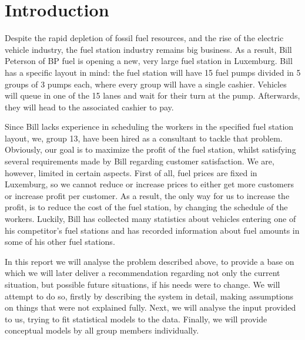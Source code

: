 \section{Introduction}
Despite the rapid depletion of fossil fuel resources, and the rise of the electric vehicle industry, the fuel station industry remains big business.
As a result, Bill Peterson of BP fuel is opening a new, very large fuel station in Luxemburg.
Bill has a specific layout in mind: the fuel station will have 15 fuel pumps divided in 5 groups of 3 pumps each, where every group will have a single cashier.
Vehicles will queue in one of the 15 lanes and wait for their turn at the pump.
Afterwards, they will head to the associated cashier to pay.

Since Bill lacks experience in scheduling the workers in the specified fuel station layout, we, group 13, have been hired as a consultant to tackle that problem.
Obviously, our goal is to maximize the profit of the fuel station, whilst satisfying several requirements made by Bill regarding customer satisfaction.
We are, however, limited in certain aspects.
First of all, fuel prices are fixed in Luxemburg, so we cannot reduce or increase prices to either get more customers or increase profit per customer.
As a result, the only way for us to increase the profit, is to reduce the cost of the fuel station, by changing the schedule of the workers.
Luckily, Bill has collected many statistics about vehicles entering one of his competitor's fuel stations and has recorded information about fuel amounts in some of his other fuel stations.

In this report we will analyse the problem described above, to provide a base on which we will later deliver a recommendation regarding not only the current situation, but possible future situations, if his needs were to change.
We will attempt to do so, firstly by describing the system in detail, making assumptions on things that were not explained fully.
Next, we will analyse the input provided to us, trying to fit statistical models to the data.
Finally, we will provide conceptual models by all group members individually.